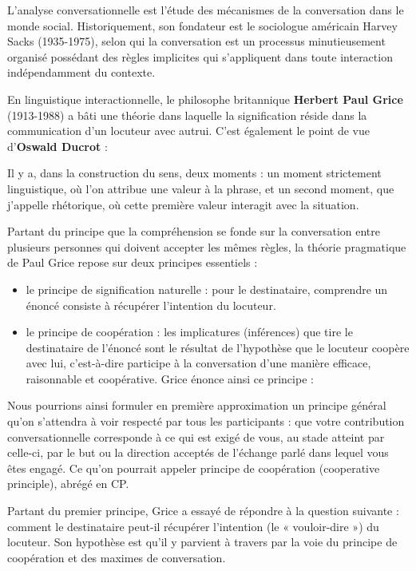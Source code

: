 L’analyse conversationnelle est l’étude des mécanismes de la conversation dans le monde social. Historiquement, son fondateur est le sociologue américain Harvey Sacks (1935-1975), selon qui la conversation est un processus minutieusement organisé possédant des règles implicites qui s’appliquent dans toute interaction indépendamment du contexte.

En linguistique interactionnelle, le philosophe britannique \textbf{Herbert Paul Grice} (1913-1988) a bâti une théorie dans laquelle la signification réside dans la communication d’un locuteur avec autrui. C’est également le point de vue d’\textbf{Oswald Ducrot} :
\begin{lecture}{}
Il y a, dans la construction du sens, deux moments : un moment strictement linguistique, où l’on attribue une valeur à la phrase, et un second moment, que j’appelle rhétorique, où cette première valeur interagit avec la situation.
\end{lecture}
Partant du principe que la compréhension se fonde sur la conversation entre plusieurs personnes qui doivent accepter les mêmes règles, la théorie pragmatique de Paul Grice repose sur deux principes essentiels :
\begin{itemize}
\item le principe de signification naturelle : pour le destinataire, comprendre un énoncé consiste à récupérer l’intention du locuteur.
\end{itemize}
\begin{itemize}
\item le principe de coopération : les implicatures (inférences) que tire le destinataire de l’énoncé sont le résultat de l’hypothèse que le locuteur coopère avec lui, c’est-à-dire participe à la conversation d’une manière efficace, raisonnable et coopérative. Grice énonce ainsi ce principe :
\end{itemize}
\begin{lecture}{}
Nous pourrions ainsi formuler en première approximation un principe général qu’on s’attendra à voir respecté par tous les participants : que votre contribution conversationnelle corresponde à ce qui est exigé de vous, au stade atteint par celle-ci, par le but ou la direction acceptés de l’échange parlé dans lequel vous êtes engagé. Ce qu’on pourrait appeler principe de coopération (cooperative principle), abrégé en CP.
\end{lecture}
Partant du premier principe, Grice a essayé de répondre à la question suivante : comment le destinataire peut-il récupérer l’intention (le « vouloir-dire ») du locuteur. Son hypothèse est qu’il y parvient à travers par la voie du principe de coopération et des maximes de conversation.

